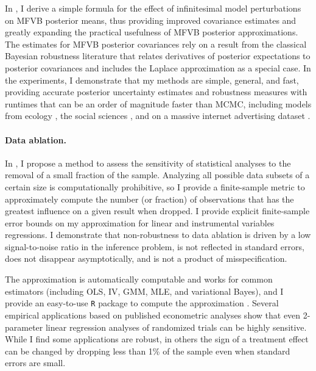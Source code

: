 In \citet{giordano:2015:linear, giordano:2018:covariances}, I derive a simple
formula for the effect of infinitesimal model perturbations on MFVB posterior
means, thus providing improved covariance estimates and greatly expanding the
practical usefulness of MFVB posterior approximations. The estimates for MFVB
posterior covariances rely on a result from the classical Bayesian robustness
literature that relates derivatives of posterior expectations to posterior
covariances and includes the Laplace approximation as a special case.
In the experiments, I demonstrate that my methods are simple, general, and
fast, providing accurate posterior uncertainty estimates and robustness measures
with runtimes that can be an order of magnitude faster than MCMC, including
models from ecology \citep{kery:2011:bayesian}, the social sciences
\citep{gelman:2006:arm}, and on a massive internet advertising dataset
\citep{criteo:2014:dataset}.



\paragraph{Data ablation.}

In \citet{giordano:2020:amip}, I propose a method to assess the sensitivity of
statistical analyses to the removal of a small fraction of the sample. Analyzing
all possible data subsets of a certain size is computationally prohibitive, so I
provide a finite-sample metric to approximately compute the number (or fraction)
of observations that has the greatest influence on a given result when dropped.
I provide explicit finite-sample error bounds on my approximation for linear
and instrumental variables regressions.
I demonstrate
that non-robustness to data ablation is driven by a low signal-to-noise ratio in
the inference problem, is not reflected in standard errors, does not disappear
asymptotically, and is not a product of misspecification.

The approximation is automatically computable and works for common estimators
(including OLS, IV, GMM, MLE, and variational Bayes), and I provide an
easy-to-use \texttt{R} package to compute the approximation
\citep{zaminfluence}. Several empirical applications based on published
econometric analyses \citep{angelucci:2009:indirect, finkelstein:2012:oregon,
meager:2019:microcredit} show that even 2-parameter linear regression analyses
of randomized trials can be highly sensitive. While I find some applications are
robust, in others the sign of a treatment effect can be changed by dropping less
than 1\% of the sample even when standard errors are small.




